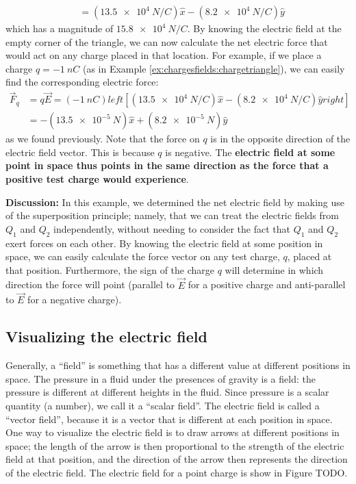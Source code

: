\begin{example}
\begin{align*}
&=(\SI{13.5e4}{N/C})\hat x-(\SI{8.2e4}{N/C})\hat y
\end{align*}
which has a magnitude of $\SI{15.8e4}{N/C}$. By knowing the electric field at the empty corner of the triangle, we can now calculate the net electric force that would act on any charge placed in that location. For example, if we place a charge $q=\SI{-1}{nC}$ (as in Example \ref{ex:chargesfields:chargetriangle}), we can easily find the corresponding electric force:
\begin{align*}
\vec F_q &= q\vec E=(\SI{-1}{nC})left[ (\SI{13.5e4}{N/C})\hat x-(\SI{8.2e4}{N/C})\hat y right]\\
&=-(\SI{13.5e-5}{N})\hat x+(\SI{8.2e-5}{N})\hat y
\end{align*}
as we found previously. Note that the force on $q$ is in the opposite direction of the electric field vector. This is because $q$ is negative. The \textbf{electric field at some point in space thus points in the same direction as the force that a positive test charge would experience}.

\textbf{Discussion:} In this example, we determined the net electric field by making use of the superposition principle; namely, that we can treat the electric fields from $Q_1$ and $Q_2$ independently, without needing to consider the fact that $Q_1$ and $Q_2$ exert forces on each other. By knowing the electric field at some position in space, we can easily calculate the force vector on any test charge, $q$, placed at that position. Furthermore, the sign of the charge $q$ will determine in which direction the force will point (parallel to $\vec E$ for a positive charge and anti-parallel to $\vec E$ for a negative charge).
\end{example}

\subsection{Visualizing the electric field}
Generally, a ``field'' is something that has a different value at different positions in space. The pressure in a fluid under the presences of gravity is a field: the pressure is different at different heights in the fluid. Since pressure is a scalar quantity (a number), we call it a ``scalar field''. The electric field is called a ``vector field'', because it is a vector that is different at each position in space. One way to visualize the electric field is to draw arrows at different positions in space; the length of the arrow is then proportional to the strength of the electric field at that position, and the direction of the arrow then represents the direction of the electric field. The electric field for a point charge is show in Figure TODO.

